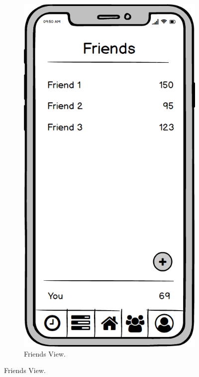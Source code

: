 \begin{figure}
    \centering
    \begin{subfigure}[b]{0.3\textwidth}
        \centering
        \includegraphics[width=\textwidth]{./graphics/design/Friends.png}
        \caption{Friends View.}

\end{subfigure}
\end{figure}
